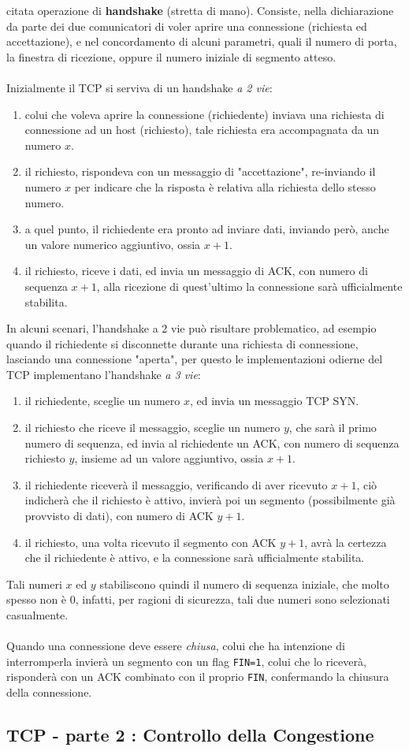 \documentclass[12pt, letterpaper]{article}
\newcommand{\code}[1]{\colorbox{light-gray}{\texttt{#1}}}
\newcommand{\acc}{\\\hphantom{}\\}
\begin{document}
citata operazione di \textbf{handshake} (stretta di mano). Consiste, nella dichiarazione da parte dei due comunicatori 
di voler aprire una connessione (richiesta ed accettazione), e nel concordamento di alcuni parametri, quali il 
numero di porta, la finestra di ricezione, oppure il numero iniziale di segmento atteso.\acc 
Inizialmente il TCP si serviva di un handshake \textit{a 2 vie}:\begin{enumerate}
    \item 
 colui che voleva aprire la connessione (richiedente) 
inviava una richiesta di connessione ad un host (richiesto), tale richiesta era accompagnata da un numero 
$x$.     \item  il richiesto, rispondeva con un messaggio di "accettazione", re-inviando il numero $x$ per indicare 
che la risposta è relativa alla richiesta dello stesso numero.
\item a quel punto, il richiedente era pronto ad inviare dati, inviando però, anche un valore numerico aggiuntivo, 
ossia $x+1$. 
\item il richiesto, riceve i dati, ed invia un messaggio di ACK, con numero di sequenza $x+1$, alla ricezione di quest'ultimo 
la connessione sarà ufficialmente stabilita.
\end{enumerate}
In alcuni scenari, l'handshake a 2 vie può risultare problematico, ad esempio quando il richiedente si disconnette 
durante una richiesta di connessione, lasciando una connessione "aperta", per questo le implementazioni odierne del TCP 
implementano l'handshake \textit{a 3 vie}:\begin{enumerate}
    \item il richiedente, sceglie un numero $x$, ed invia un messaggio TCP SYN. 
    \item il richiesto che riceve il messaggio, sceglie un numero $y$, che sarà il primo numero di 
    sequenza, ed invia al richiedente un ACK, con numero di sequenza richiesto $y$, insieme ad un valore aggiuntivo,
    ossia $x+1$. 
    \item il richiedente riceverà il messaggio, verificando di aver ricevuto $x+1$, ciò indicherà che il 
    richiesto è attivo, invierà poi un segmento (possibilmente 
    già provvisto di dati), con numero di ACK $y+1$. 
    \item il richiesto, una volta ricevuto il segmento con ACK $y+1$, avrà la certezza che il richiedente è attivo, 
    e la connessione sarà ufficialmente stabilita.
\end{enumerate}
Tali numeri $x$ ed $y$ stabiliscono quindi il numero di sequenza iniziale, che molto spesso non è 0, infatti, 
per ragioni di sicurezza,  tali due numeri sono selezionati casualmente.\acc
Quando una connessione deve essere \textit{chiusa}, colui che ha intenzione di interromperla invierà un segmento 
con un flag \code{FIN=1}, colui che lo riceverà, risponderà con un ACK combinato con il proprio \code{FIN}, 
confermando la chiusura della connessione.
\subsection{TCP - parte 2 : Controllo della Congestione }
\end{document}
